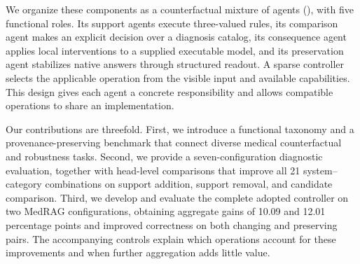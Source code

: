 We organize these components as a counterfactual mixture of agents (\cfmoa{}), with five functional roles. Its support agents execute three-valued rules, its comparison agent makes an explicit decision over a diagnosis catalog, its consequence agent applies local interventions to a supplied executable model, and its preservation agent stabilizes native answers through structured readout. A sparse controller selects the applicable operation from the visible input and available capabilities. This design gives each agent a concrete responsibility and allows compatible operations to share an implementation.

Our contributions are threefold. First, we introduce a functional taxonomy and a provenance-preserving benchmark that connect diverse medical counterfactual and robustness tasks. Second, we provide a seven-configuration diagnostic evaluation, together with head-level comparisons that improve all 21 system--category combinations on support addition, support removal, and candidate comparison. Third, we develop \cfmoa{} and evaluate the complete adopted controller on two MedRAG configurations, obtaining aggregate gains of 10.09 and 12.01 percentage points and improved correctness on both changing and preserving pairs. The accompanying controls explain which operations account for these improvements and when further aggregation adds little value.
